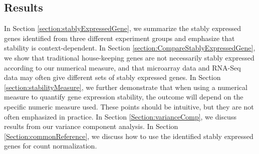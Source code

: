 %
%



\subsection{Results} \label{section:Results}
In Section \ref{section:stablyExpressedGene}, we summarize the stably expressed genes identified 
from three
different experiment groups and emphasize that stability is context-dependent.
In Section \ref{section:CompareStablyExpressedGene}, we show that traditional house-keeping
genes are not necessarily stably expressed according to our numerical measure, 
and that microarray data and RNA-Seq data may often	 give different sets of stably
expressed genes.  In Section \ref{section:stabilityMeasure}, we further demonstrate that when using 
a
numerical measure to quantify gene expression stability, the outcome will
depend on the specific numeric measure used.  These points should be
intuitive, but they are not often emphasized in practice.  In Section
\ref{Section:varianceComp}, we discuss results from our variance component analysis. In Section
\ref{Section:commonReference}, we discuss how to use the identified stably
expressed genes for count normalization.

